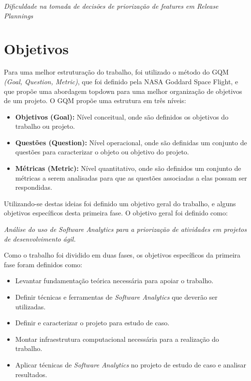 \begin{center}
 \textit{Dificuldade na tomada de decisões de priorização de features em
  Release Plannings}
\end{center}

\section{Objetivos}
\label{int:obj}
Para uma melhor estruturação do trabalho, foi utilizado o método do
GQM \textit{(Goal, Question, Metric)}, que foi definido pela NASA Goddard Space
Flight, e que propõe uma abordagem topdown para uma melhor organização de objetivos
de um projeto. O GQM propõe uma estrutura em três níveis\cite{gqm}:

\begin{itemize}
    \item \textbf{Objetivos (Goal):} Nível conceitual, onde são definidos os
        objetivos do trabalho ou projeto.
    \item \textbf{Questões (Question):} Nível operacional, onde são definidas um
        conjunto de questões para caracterizar o objeto ou objetivo do projeto.
    \item \textbf{Métricas (Metric):} Nível quantitativo, onde são definidos um
        conjunto de métricas a serem analisadas para que as questões associadas
        a elas possam ser respondidas.
\end{itemize}

Utilizando-se destas ideias foi definido um objetivo geral do trabalho, e alguns
objetivos específicos desta primeira fase. O objetivo geral foi definido como:

\begin{center}
    \textit{Análise do uso de Software Analytics para a priorização
        de atividades em projetos de desenvolvimento ágil.}
\end{center}

Como o trabalho foi dividido em duas fases, os objetivos específicos da primeira
fase foram definidos como:

\begin{itemize}
    \item Levantar fundamentação teórica necessária para apoiar o trabalho.
    \item Definir técnicas e ferramentas de \textit{Software Analytics} que deverão ser utilizadas.
    \item Definir e caracterizar o projeto para estudo de caso.
    \item Montar infraestrutura computacional necessária para a realização do trabalho.
    \item Aplicar técnicas de \textit{Software Analytics} no projeto de estudo de caso e analisar resultados.
\end{itemize}

